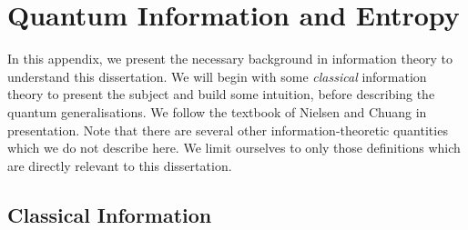 \documentclass[12pt,a4paper]{report}
\numberwithin{equation}{section}
\theoremstyle{definition}
\theoremstyle{theorem}
\theoremstyle{theorem}
\theoremstyle{example}
\theoremstyle{definition}
\begin{document}
\chapter{Quantum Information and Entropy}\label{apb}
In this appendix, we present the necessary background in information theory to understand this dissertation. We will begin with some \textit{classical} information theory to present the subject and build some intuition, before describing the quantum generalisations. We follow the textbook of Nielsen and Chuang \cite{NielsenChuang} in presentation. Note that there are several other information-theoretic quantities which we do not describe here. We limit ourselves to only those definitions which are directly relevant to this dissertation.
\section{Classical Information}
\end{document}
